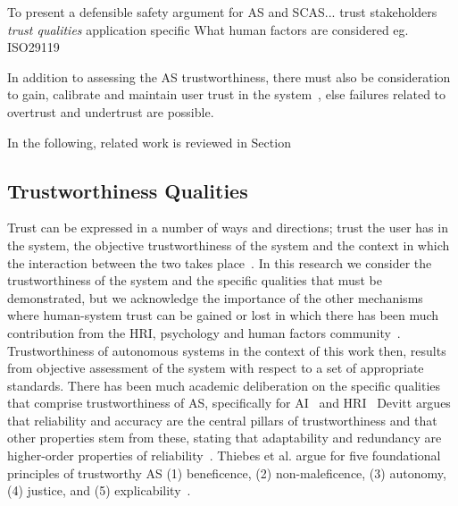 %
To present a defensible safety argument for AS and SCAS...
trust stakeholders
\emph{trust qualities}
application specific
What human factors are considered eg. ISO29119


In addition to assessing the AS trustworthiness, there must also be consideration to gain, calibrate and maintain user trust in the system~\cite{kok2020trust, Chiou2021}, else failures related to overtrust and undertrust are possible. 


In the following, related work is reviewed in Section



\subsection{Trustworthiness Qualities}

Trust can be expressed in a number of ways and directions; trust the user has in the system, the objective trustworthiness of the system and the context in which the interaction between the two takes place~\cite{Hancock2021}. 
%
In this research we consider the trustworthiness of the system and the specific qualities that must be demonstrated, but we acknowledge the importance of the other mechanisms where human-system trust can be gained or lost in which there has been much contribution from the HRI, psychology and human factors community~\cite{Floridi2019,Lee2004,kok2020trust,Chiou2021,Kohn2021,kraus2022trustworthy}. 
%
Trustworthiness of autonomous systems in the context of this work then, results from objective assessment of the system with respect to a set of appropriate standards. 
%
There has been much academic deliberation on the specific qualities that comprise trustworthiness of AS, specifically for AI~\cite{Thiebes2021,Wing2021} and HRI~\cite{kraus2022trustworthy,atkinson2012trust}
%
Devitt argues that reliability and accuracy are the central pillars of trustworthiness and that other properties stem from these, stating that adaptability and redundancy are higher-order properties of reliability~\cite{devitt2018trustworthiness}. 
%
Thiebes et al. argue for five foundational principles of trustworthy AS (1) beneficence, (2) non-maleficence, (3) autonomy, (4) justice, and (5) explicability~\cite{Thiebes2021}.  


